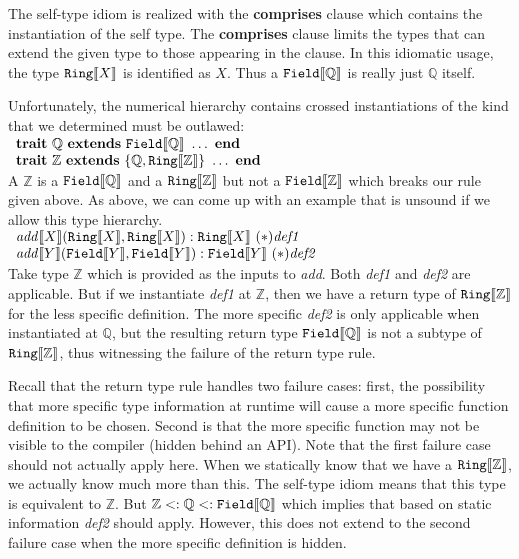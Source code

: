 \documentclass[preprint]{sigplanconf}
\newcommand{\ob}[1]{\ensuremath{\llbracket {#1} \rrbracket}}
\begin{document}
The self-type idiom is realized with the {\bf comprises} clause which contains the instantiation of the self type.
The {\bf comprises} clause limits the types that can extend the given type to those appearing in the clause.
In this idiomatic usage, the type ${\tt Ring}\ob{X}$ is identified as $X$.  Thus a ${\tt Field}\ob{\mathbb{Q}}$
is really just $\mathbb{Q}$ itself.

Unfortunately, the numerical hierarchy contains crossed instantiations of the kind that we determined
must be outlawed:\\

$\begin{array}{l}
{\bf trait}~\mathbb{Q}~{\bf extends}~{\tt Field}\ob{\mathbb{Q}}~\ldots~{\bf end}\\
{\bf trait}~\mathbb{Z}~{\bf extends}~\{ \mathbb{Q}, {\tt Ring}\ob{\mathbb{Z}}\}~\ldots~{\bf end}\\
\end{array}$\\

A $\mathbb{Z}$ is a ${\tt Field}\ob{\mathbb{Q}}$ and a ${\tt Ring}\ob{\mathbb{Z}}$ but not
a ${\tt Field}\ob{\mathbb{Z}}$ which breaks our rule given above.  As above, we can come
up with an example that is unsound if we allow this type hierarchy.\\

$\begin{array}{l}
{\it add}\ob{X}({\tt Ring}\ob{X}, {\tt Ring}\ob{X}) :{\tt Ring}\ob{X}~(*){\it def1}\\
{\it add}\ob{Y}({\tt Field}\ob{Y},{\tt Field}\ob{Y}) : {\tt Field}\ob{Y}~(*){\it def2}\\
\end{array}$\\

Take type $\mathbb{Z}$ which is provided as the inputs to {\it add}.  Both {\it def1} and {\it def2}
are applicable.  But if we instantiate {\it def1}
at $\mathbb{Z}$, then we have a return type of ${\tt Ring}\ob{\mathbb{Z}}$ for the less specific
definition.  The more specific {\it def2} is only applicable when instantiated at $\mathbb{Q}$, but the
resulting return type ${\tt Field}\ob{\mathbb{Q}}$ is not a subtype of ${\tt Ring}\ob{\mathbb{Z}}$,
thus witnessing the failure of the return type rule.

Recall that the return type rule handles two failure cases: first, the possibility that more specific
type information at runtime will cause a more specific function definition to be chosen.  Second
is that the more specific function may not be visible to the compiler (hidden behind an API).  Note
that the first failure case should not actually apply here.  When we statically know that we have
a ${\tt Ring}\ob{\mathbb{Z}}$, we actually know much more than this.  The self-type idiom means
that this type is equivalent to $\mathbb{Z}$.  But $\mathbb{Z} <: \mathbb{Q} <: {\tt Field}\ob{\mathbb{Q}}$
which implies that based on static information {\it def2} should apply.  However, this does not extend to
the second failure case when the more specific definition is hidden.
\end{document}
